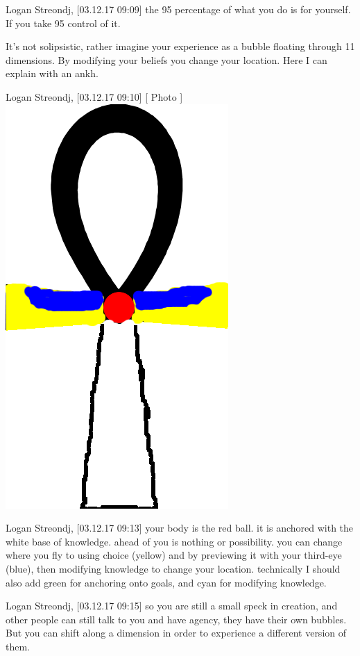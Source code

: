 Logan Streondj, [03.12.17 09:09]
the 95%
percentage of what you do is for yourself. 
If you take 95%
control of it.  

It's not solipsistic,  rather imagine your experience as a bubble floating
through 11 dimensions.
By modifying your beliefs you change your location. Here I can explain with an
ankh.

Logan Streondj, [03.12.17 09:10]
[ Photo ]
\includegraphics{photograph/lowki-ankh.png}


Logan Streondj, [03.12.17 09:13]
your body is the red ball.  it is anchored with the white base of knowledge.
ahead of you is nothing or possibility.  you can change where you fly to using
choice (yellow) and by previewing it with your third-eye (blue), then modifying
knowledge to change your location.  technically I should also add green for
anchoring onto goals, and cyan for modifying knowledge.

Logan Streondj, [03.12.17 09:15]
so you are still a small speck in creation, 
and other people can still talk to you and have agency, they have their own
bubbles.
But you can shift along a dimension in order to experience a different version
of them.

